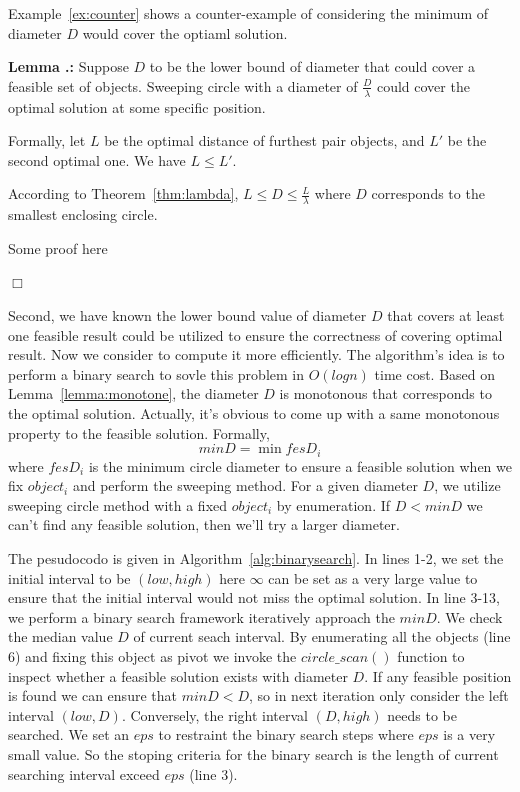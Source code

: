 \documentclass{sig-alternate}
\newcounter{example}[section]
\newcounter{theorem}[section]
\renewcommand{\thetheorem}{\nthesection.\arabic{theorem}}
\newenvironment{lemma}{\begin{em}
    \refstepcounter{theorem}
    {\vspace{1ex} \noindent\bf  Lemma  \thetheorem:}}{
    \end{em}\eop\vspace{1ex}} %
\newcommand{\nthesection}{\arabic{section}}
\newcommand{\eop}{\hspace*{\fill}\mbox{$\Box$}}
\begin{document}
Example~\ref{ex:counter} shows a counter-example of considering the minimum
of diameter $D$ would cover the optiaml solution.

\begin{lemma}\label{lemma:enlarge}
Suppose $D$ to be the lower bound of diameter that could cover a feasible
set of objects. Sweeping circle with a diameter of $\frac{D}{\lambda}$ could
cover the optimal solution at some specific position.

\proof
Formally, let $L$ be the optimal distance of furthest pair objects,
and $L'$ be the second optimal one. We have $L \leq L'$.

According to Theorem~\ref{thm:lambda}, $L\leq D \leq \frac{L}{\lambda}$
where $D$ corresponds to the smallest enclosing circle.

Some proof here~
\end{lemma}

Second, we have known the lower bound value of diameter $D$ that covers at least
one feasible result could be utilized to ensure the correctness of
covering optimal result. Now we consider to compute it more efficiently.
The algorithm's idea is to perform a binary search to sovle this problem
in $O(logn)$ time cost. 
Based on Lemma~\ref{lemma:monotone}, the diameter $D$ is monotonous
that corresponds to the optimal solution. Actually, it's obvious to come
up with a same monotonous property to the feasible solution.
Formally, 
\begin{displaymath}
minD = \min{fesD_i}
\end{displaymath}
where $fesD_i$ is the minimum circle diameter to ensure a feasible solution
when we fix $object_i$ and perform the sweeping method. For a given diameter $D$,
we utilize sweeping circle method with a fixed $object_i$ by enumeration. If $D<minD$
we can't find any feasible solution, then we'll try a larger diameter.

The pesudocodo is given in Algorithm~\ref{alg:binarysearch}. In lines 1-2,
we set the initial interval to be $(low, high)$ here $\infty$ can be set as a very
large value to ensure that the initial interval would not miss the optimal solution.
In line 3-13, we perform a binary search framework iteratively approach the $minD$.
We check the median value $D$ of current seach interval. By enumerating all the objects (line 6)
and fixing this object as pivot we invoke the $circle\_scan()$ function
to inspect whether a feasible solution exists with diameter $D$.
If any feasible position is found we can ensure that $minD < D$, so in next iteration
only consider the left interval $(low,D)$. Conversely, the right interval $(D,high)$
needs to be searched. We set an $eps$ to restraint the binary search steps where
$eps$ is a very small value. So the stoping criteria for the binary search is the length
of current searching interval exceed $eps$ (line 3). 
\end{document}
